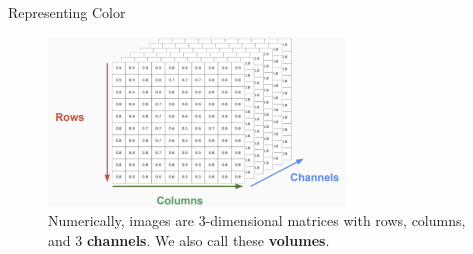 \begin{frame}{Representing Color}
\begin{figure}
    \centering
    \includegraphics[width=0.7\textwidth]{img/rowcolchannel.png}
    \caption{Numerically, images are 3-dimensional matrices with rows, columns, and 3 \textbf{channels}. We also call these \textbf{volumes}.}
\end{figure}
\end{frame}